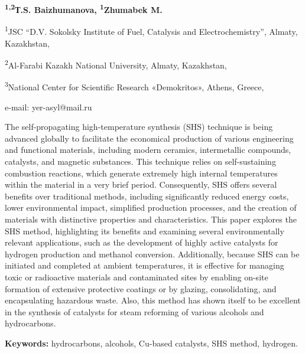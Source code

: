 {\bfseries \textsuperscript{1,2}Т.S. Baizhumanova,
\textsuperscript{1}Zhumabek M.}

\textsuperscript{1}JSC ``D.V. Sokolsky Institute of Fuel, Catalysis and
Electrochemistry'', Almaty, Kazakhstan,

\textsuperscript{2}Al-Farabi Kazakh National University, Almaty,
Kazakhstan,

\textsuperscript{3}National Center for Scientific Research «Demokritos»,
Athens, Greece,

e-mail: yer-asyl@mail.ru

The self-propagating high-temperature synthesis (SHS) technique is being
advanced globally to facilitate the economical production of various
engineering and functional materials, including modern ceramics,
intermetallic compounds, catalysts, and magnetic substances. This
technique relies on self-sustaining combustion reactions, which generate
extremely high internal temperatures within the material in a very brief
period. Consequently, SHS offers several benefits over traditional
methods, including significantly reduced energy costs, lower
environmental impact, simplified production processes, and the creation
of materials with distinctive properties and characteristics. This paper
explores the SHS method, highlighting its benefits and examining several
environmentally relevant applications, such as the development of highly
active catalysts for hydrogen production and methanol conversion.
Additionally, because SHS can be initiated and completed at ambient
temperatures, it is effective for managing toxic or radioactive
materials and contaminated sites by enabling on-site formation of
extensive protective coatings or by glazing, consolidating, and
encapsulating hazardous waste. Also, this method has shown itself to be
excellent in the synthesis of catalysts for steam reforming of various
alcohols and hydrocarbons.

{\bfseries Keywords:} hydrocarbons, alcohols, Cu-based catalysts, SHS
method, hydrogen.

